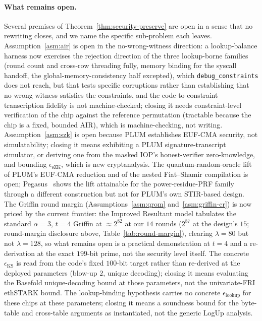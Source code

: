 \paragraph{What remains open.}
Several premises of Theorem~\ref{thm:security-preserve} are open in a sense that no rewriting closes, and we name the specific sub-problem each leaves. Assumption~\ref{asm:air} is open in the no-wrong-witness direction: a lookup-balance harness now exercises the rejection direction of the three lookup-borne families (round count and cross-row threading fully, memory binding for the syscall handoff, the global-memory-consistency half excepted), which \texttt{debug\_constraints} does not reach, but that tests specific corruptions rather than establishing that no wrong witness satisfies the constraints, and the code-to-constraint transcription fidelity is not machine-checked; closing it needs constraint-level verification of the chip against the reference permutation (tractable because the chip is a fixed, bounded AIR), which is machine-checking, not writing. Assumption~\ref{asm:szk} is open because PLUM establishes EUF-CMA security, not simulatability; closing it means exhibiting a PLUM signature-transcript simulator, or deriving one from the masked IOP's honest-verifier zero-knowledge, and bounding $\epsilon_{\mathrm{sZK}}$, which is new cryptanalysis. The quantum-random-oracle lift of PLUM's EUF-CMA reduction and of the nested Fiat--Shamir compilation is open; Pegasus~\cite{cryptoeprint:2025/1841} shows the lift attainable for the power-residue-PRF family through a different construction but not for PLUM's own STIR-based design. The Griffin round margin (Assumptions~\ref{asm:qrom} and~\ref{asm:griffin-cr}) is now priced by the current frontier: the Improved Resultant model tabulates the standard $\alpha=3$, $t=4$ Griffin at $\approx 2^{82}$ at our $14$ rounds ($2^{87}$ at the design's $15$; round-margin disclosure above, Table~\ref{tab:round-margin}), clearing $\lambda=80$ but not $\lambda=128$, so what remains open is a practical demonstration at $t=4$ and a re-derivation at the exact $199$-bit prime, not the security level itself. The concrete $\epsilon_{\mathrm{KS}}$ is read from the code's fixed $100$-bit target rather than re-derived at the deployed parameters (blow-up $2$, unique decoding); closing it means evaluating the Basefold unique-decoding bound at those parameters, not the univariate-FRI ethSTARK bound. The lookup-binding hypothesis carries no concrete $\epsilon_{\mathrm{lookup}}$ for these chips at these parameters; closing it means a soundness bound for the byte-table and cross-table arguments as instantiated, not the generic LogUp analysis. 

